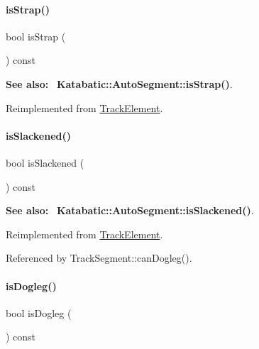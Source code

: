 \paragraph{\texorpdfstring{is\+Strap()}{isStrap()}}
{\footnotesize\ttfamily bool is\+Strap (\begin{DoxyParamCaption}{ }\end{DoxyParamCaption}) const\hspace{0.3cm}{\ttfamily [virtual]}}

{\bfseries See also\+:}~ \textbf{ Katabatic\+::\+Auto\+Segment\+::is\+Strap()}. 

Reimplemented from \mbox{\hyperlink{classKite_1_1TrackElement_a62d61c231cf404a814ae37665fa8164f}{Track\+Element}}.

\mbox{\label{classKite_1_1TrackSegment_a782cff57d3fe10e758d19ee65a06643d}} 
\paragraph{\texorpdfstring{is\+Slackened()}{isSlackened()}}
{\footnotesize\ttfamily bool is\+Slackened (\begin{DoxyParamCaption}{ }\end{DoxyParamCaption}) const\hspace{0.3cm}{\ttfamily [virtual]}}

{\bfseries See also\+:}~ \textbf{ Katabatic\+::\+Auto\+Segment\+::is\+Slackened()}. 

Reimplemented from \mbox{\hyperlink{classKite_1_1TrackElement_a782cff57d3fe10e758d19ee65a06643d}{Track\+Element}}.



Referenced by Track\+Segment\+::can\+Dogleg().

\mbox{\label{classKite_1_1TrackSegment_a75d91371e5281dd21f60ff39ae70a3e5}} 
\paragraph{\texorpdfstring{is\+Dogleg()}{isDogleg()}}
{\footnotesize\ttfamily bool is\+Dogleg (\begin{DoxyParamCaption}{ }\end{DoxyParamCaption}) const\hspace{0.3cm}{\ttfamily [virtual]}}

